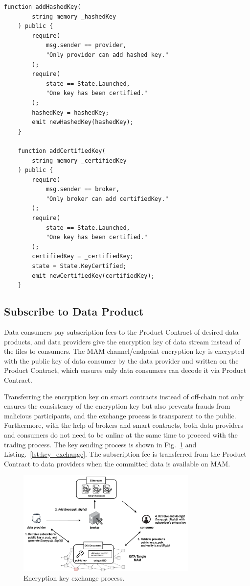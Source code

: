 \documentclass[conference]{IEEEtran}
\begin{document}
\begin{lstlisting}[caption={Functions of hased key update and certified key update}, label={lst:key_certification}, frame=single]
    function addHashedKey(
        string memory _hashedKey
    ) public {
        require(
            msg.sender == provider,
            "Only provider can add hashed key."
        );
        require(
            state == State.Launched,
            "One key has been certified."
        );
        hashedKey = hashedKey;
        emit newHashedKey(hashedKey);
    }

    function addCertifiedKey(
        string memory _certifiedKey
    ) public {
        require(
            msg.sender == broker,
            "Only broker can add certifiedKey."
        );
        require(
            state == State.Launched,
            "One key has been certified."
        );
        certifiedKey = _certifiedKey;
        state = State.KeyCertified;
        emit newCertifiedKey(certifiedKey);
    }
\end{lstlisting}

\subsection{Subscribe to Data Product}
Data consumers pay subscription fees to the Product Contract of desired data products, and data providers give the encryption key of data stream instead of the files to consumers. The MAM channel/endpoint encryption key is encrypted with the public key of data consumer by the data provider and written on the Product Contract, which ensures only data consumers can decode it via Product Contract.

Transferring the encryption key on smart contracts instead of off-chain not only ensures the consistency of the encryption key but also prevents frauds from malicious participants, and the exchange process is transparent to the public. Furthermore, with the help of brokers and smart contracts, both data providers and consumers do not need to be online at the same time to proceed with the trading process. The key sending process is shown in Fig.~\ref{fig:key_exchange} and Listing.~\ref{lst:key_exchange}. The subscription fee is transferred from the Product Contract to data providers when the committed data is available on MAM.

\begin{figure}[!t]
    \centering
    \includegraphics[width=3.5in]{key_exchange}
    \caption{Encryption key exchange process.}
    \label{fig:key_exchange}
\end{figure}
\end{document}
